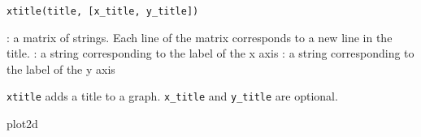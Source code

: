 
\begin{mandesc}
\end{mandesc}

\begin{calling_sequence}
\begin{verbatim}
xtitle(title, [x_title, y_title])
\end{verbatim}
\end{calling_sequence}
\begin{parameters}
  \begin{varlist}
    : a matrix of strings. Each line of the matrix corresponds to a new line
    in the title.
    : a string corresponding to the label of the x axis
    : a string corresponding to the label of the y axis
\end{varlist}
\end{parameters}

\begin{mandescription}
  \verb+xtitle+ adds a title to a graph. \verb+x_title+ and \verb+y_title+ are optional.
\end{mandescription}

\begin{examples}
  \begin{program}
  \end{program}
\end{examples}

\begin{manseealso}
  plot2d
\end{manseealso}


